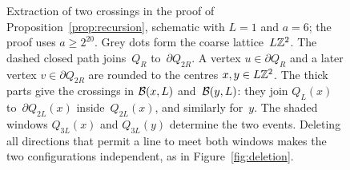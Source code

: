 \documentclass[11pt,letterpaper]{article}
\begin{document}
\begin{figure}[ht]
  \centering
  
  \caption{Extraction of two crossings in the proof of Proposition~\ref{prop:recursion}, schematic with $L=1$ and $a=6$; the proof uses $a\ge2^{20}$. Grey dots form the coarse lattice~$L\mathbb Z^2$. The dashed closed path joins~$Q_R$ to~$\partial Q_{2R}$. A vertex $u\in\partial Q_R$ and a later vertex $v\in\partial Q_{2R}$ are rounded to the centres $x,y\in L\mathbb Z^2$. The thick parts give the crossings in $\mathcal B(x,L)$ and~$\mathcal B(y,L)$: they join $Q_L(x)$ to~$\partial Q_{2L}(x)$ inside~$Q_{2L}(x)$, and similarly for~$y$. The shaded windows $Q_{3L}(x)$ and $Q_{3L}(y)$ determine the two events. Deleting all directions that permit a line to meet both windows makes the two configurations independent, as in Figure~\ref{fig:deletion}.}
  \label{fig:recursion}
\end{figure}
\end{document}
